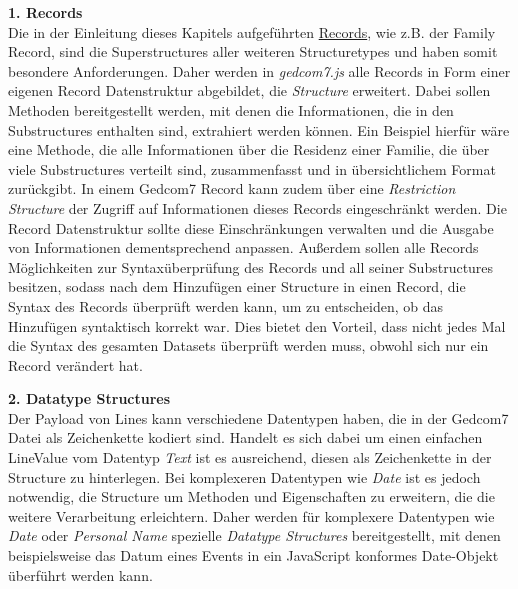 \vspace{1em}
\textbf{1. Records} \vspace{0.5em} \\
Die in der Einleitung dieses Kapitels aufgeführten \hyperref[liste records]{Records}, wie z.B. der Family Record, sind die Superstructures aller weiteren Structuretypes und haben somit besondere Anforderungen. Daher werden in \textit{gedcom7.js} alle Records in Form einer eigenen Record Datenstruktur abgebildet, die \textit{Structure} erweitert. Dabei sollen Methoden bereitgestellt werden, mit denen die Informationen, die in den Substructures enthalten sind, extrahiert werden können. Ein Beispiel hierfür wäre eine Methode, die alle Informationen über die Residenz einer Familie, die über viele Substructures verteilt sind, zusammenfasst und in übersichtlichem Format zurückgibt. In einem Gedcom7 Record kann zudem über eine \textit{Restriction Structure} der Zugriff auf Informationen dieses Records eingeschränkt werden. Die Record Datenstruktur sollte diese Einschränkungen verwalten und die Ausgabe von Informationen dementsprechend anpassen. Außerdem sollen alle Records Möglichkeiten zur Syntaxüberprüfung des Records und all seiner Substructures besitzen, sodass nach dem Hinzufügen einer Structure in einen Record, die Syntax des Records überprüft werden kann, um zu entscheiden, ob das Hinzufügen syntaktisch korrekt war. Dies bietet den Vorteil, dass nicht jedes Mal die Syntax des gesamten Datasets überprüft werden muss, obwohl sich nur ein Record verändert hat.

\vspace{1em}
\textbf{2. Datatype Structures} \vspace{0.5em} \\
Der Payload von Lines kann verschiedene Datentypen haben, die in der Gedcom7 Datei als Zeichenkette kodiert sind. Handelt es sich dabei um einen einfachen LineValue vom Datentyp \textit{Text} ist es ausreichend, diesen als Zeichenkette in der Structure zu hinterlegen. Bei komplexeren Datentypen wie \textit{Date} ist es jedoch notwendig, die Structure um Methoden und Eigenschaften zu erweitern, die die weitere Verarbeitung erleichtern. Daher werden für komplexere Datentypen wie \textit{Date} oder \textit{Personal Name} spezielle \textit{Datatype Structures} bereitgestellt, mit denen beispielsweise das Datum eines Events in ein JavaScript konformes Date-Objekt überführt werden kann.

